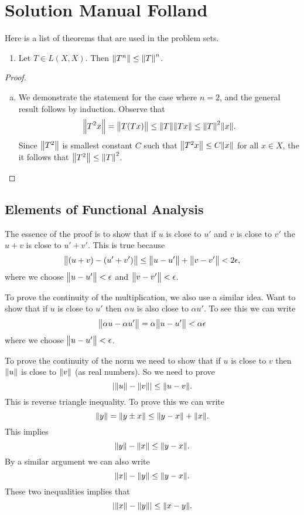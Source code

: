 \chapter{Solution Manual Folland}

Here is a list of theorems that are used in the problem sets.
\begin{proposition}
	\begin{enumerate}
		\item Let $ T \in L(X,X) $. Then $ \norm{T^n} \leq \norm{T}^n $.
	\end{enumerate}
\end{proposition}
\begin{proof}
	\begin{enumerate}[(a)]
		\item We demonstrate the statement for the case where $ n=2 $, and the general result follows by induction. Observe that
		\[ \norm{T^2x} = \norm{T(Tx)} \leq \norm{T} \norm{Tx} \leq \norm{T}^2\norm{x}. \]
		Since $ \norm{T^2} $ is smallest constant $ C $ such that $ \norm{T^2x}\leq C\norm{x} $ for all $ x\in X $, the it follows that $ \norm{T^2} \leq \norm{T}^2 $.
	\end{enumerate}
\end{proof}



\section{Elements of Functional Analysis}


\begin{problem}[Folland: Ch5, P1]
	The essence of the proof is to show that if $ u $ is close to $ u' $ and $ v $ is close to $ v' $ the $ u+v $ is close to $ u'+v' $. This is true because
	\[ \norm{(u+v) - (u'+v')} \leq \norm{u-u'} + \norm{v-v'} < 2\epsilon, \]
	where we choose $ \norm{u-u'} <\epsilon $ and $ \norm{v-v'}<\epsilon $. 
	
	To prove the continuity of the multiplication, we also use a similar idea. Want to show that if $ u $ is close to $ u' $ then $ \alpha u $ is also close to $ \alpha u' $. To see this we can write
	\[ \norm{\alpha u - \alpha u'} = \alpha \norm{u - u'} < \alpha\epsilon \]
	where we choose $ \norm{u-u'} < \epsilon $.
	
	To prove the continuity of the norm we need to show that if $ u $ is close to $ v $ then $ \norm{u} $ is close to $ \norm{v} $ (as real numbers). So we need to prove
	\[ |\norm{u} - \norm{v}| \leq \norm{u - v}. \]
	This is reverse triangle inequality. To prove this we can write
	\[ \norm{y} = \norm{y \pm x} \leq \norm{y-x} +\norm{x}. \]
	This implies
	\[ \norm{y} - \norm{x} \leq \norm{y-x}. \]
	By a similar argument we can also write
	\[ \norm{x} - \norm{y} \leq \norm{y-x}. \]
	These two inequalities implies that 
	\[ |\norm{x}-\norm{y}| \leq \norm{x- y}. \]

\end{problem}

